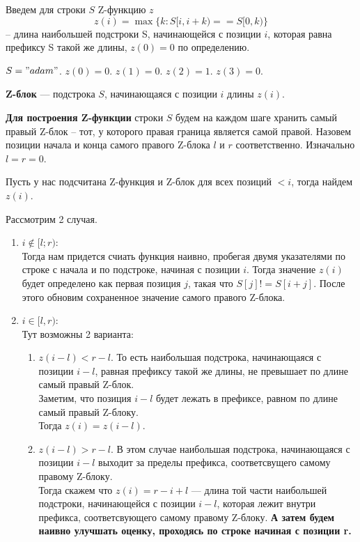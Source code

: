 Введем для строки $S$ Z-функцию $z$ 
\[
	z(i) = \max \{k: S[i, i + k) == S[0, k)\}
\]
-- длина наибольшей подстроки S, начинающейся с позиции $i$, которая равна префиксу S такой же длины, $z(0) = 0$ по определению.

\begin{example}
	$S = "adam"$. 
	$z(0) = 0.$
	$z(1) = 0.$
	$z(2) = 1.$ 
	$z(3) = 0.$
\end{example}

\begin{Def}
	\textbf{Z-блок} --- подстрока $S$, начинающаяся с позиции  $i$ длины  $z(i)$.
\end{Def}

\textbf{Для построения Z-функции} строки $S$ будем на каждом шаге хранить самый правый  Z-блок -- тот, у которого правая граница является самой правой.
Назовем позиции начала и конца самого правого Z-блока $l$ и  $r$ соответственно. Изначально $l = r = 0$. 

Пусть у нас подсчитана Z-функция и Z-блок для всех позиций $< i$, тогда найдем  $z(i)$.

Рассмотрим 2 случая. 
\begin{enumerate}
	\item \underline{$i \notin [l; r)$}: \\
		Тогда нам придется счиать функция наивно, пробегая двумя указателями по строке с начала и по подстроке, начиная с позиции $i$. Тогда значение $z(i)$ будет определено как первая позиция $j$, такая что  $S[j] != S[i + j]$.
		После этого обновим сохраненное значение самого правого Z-блока.
	\item \underline{$i \in [l, r)$}: \\
		Тут возможны 2 варианта:
		\begin{enumerate}
			\item \underline{$z(i - l) < r - l$}. То есть наибольшая подстрока, начинающаяся с позиции $i - l$, равная префиксу такой же длины, не превышает по длине самый правый Z-блок. \\
				Заметим, что позиция $i - l$ будет лежать в префиксе, равном по длине самый правый Z-блоку. \\
				Тогда $z(i) = z(i - l)$. \\
		\item \underline{$z(i - l) > r - l$}. В этом случае наибольшая подстрока, начинающаяся с позиции $i - l$ выходит за пределы префикса, соответсвущего самому правому Z-блоку. \\
				Тогда скажем  что $z(i) = r - i + l$ --- длина той части наибольшей подстроки, начинающейся с позиции  $i - l$, которая лежит внутри префикса, соответсвующего самому правому Z-блоку. \textbf{А затем будем наивно улучшать оценку, проходясь по строке начиная с позиции r.}
		\end{enumerate}
\end{enumerate}

